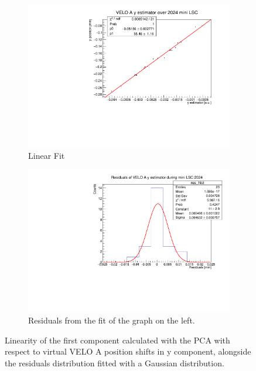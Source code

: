 \begin{figure}
    \centering
    \begin{subfigure}{0.48\textwidth}
    \includegraphics[width=\linewidth]{figures/y_fit_VELO_A_data.pdf}
    \caption{Linear Fit}\label{fig:y_veloA_fit_data}
    \end{subfigure}
    \begin{subfigure}{0.48\textwidth}
    \includegraphics[width=\linewidth]{figures/y_res_VELO_A_data.pdf}
    \caption{Residuals from the fit of the graph on the left. }\label{fig:y_veloA_res_data}
    \end{subfigure}
    \caption{Linearity of the first component calculated with the PCA with respect to virtual VELO A position shifts in y component, alongside the residuals distribution fitted with a Gaussian distribution.}
    \label{fig:y_veloA_data}
\end{figure}



